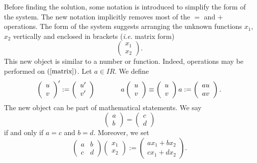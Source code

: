 \documentclass[leqno,DIV=calc,paper=a4,fontsize=11pt]{article}
\theoremstyle{definition}
\theoremstyle{plain}
\theoremstyle{remark}
\newcommand{\R}[1]{$(\ref{#1})$}
\newcommand{\rrr}{I\!\!R}
\begin{document}
Before finding the solution, some notation is introduced to simplify
the form of the system. The new notation implicitly removes most of
the $=$ and $+$ operations. The form of the system suggests arranging
the unknown functions $x_1$, $x_2$ vertically and enclosed in brackets
({\em i.e.} matrix form)
\begin{equation}
\left(
\begin{array}{c}x_1\\x_2\end{array}
\right).
\label{matrix}
\end{equation}
This new object is similar to a number or function. Indeed, operations
may be performed on \R{matrix}. Let $a\in\rrr$. We define
\[
\left(
\begin{array}{c}u\\v\end{array}
\right)' :=
\left(
\begin{array}{c}u'\\v'\end{array}
\right)
\hspace{.5in}
a\left(
\begin{array}{c}u\\v\end{array}
\right)\equiv\left(
\begin{array}{c}u\\v\end{array}
\right)a :=
\left(
\begin{array}{c}au\\av\end{array}
\right).
\]
The new object can be part of mathematical statements. We say
\[
\left(
\begin{array}{c}a\\b\end{array}
\right) =
\left(
\begin{array}{c}c\\d\end{array}
\right)
\]
if and only if $a=c$ and $b=d$. Moreover, we set
\[
\left(
\begin{array}{cc}a&b\\c&d\end{array}
\right)
\left(
\begin{array}{c}x_1\\x_2\end{array}
\right):=
\left(
\begin{array}{c}ax_1+bx_2\\cx_1+dx_2\end{array}
\right).
\]
\end{document}
